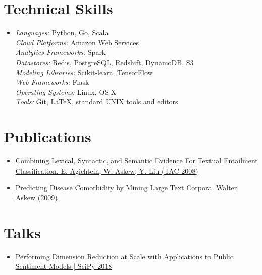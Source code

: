 \documentclass[letterpaper,10pt]{article}
\begin{document}
\section{Technical Skills}
  \begin{itemize}[leftmargin=*]
  \item[]
    \textit{Languages:} Python, Go, Scala \\
    \textit{Cloud Platforms:} Amazon Web Services\\
    \textit{Analytics Frameworks:} Spark \\
    \textit{Datastores:} Redis, PostgreSQL, Redshift, DynamoDB, S3 \\
    \textit{Modeling Libraries:} Scikit-learn, TensorFlow  \\
    \textit{Web Frameworks:} Flask \\
    \textit{Operating Systems:} Linux, OS X\\
    \textit{Tools:} Git, \LaTeX, standard UNIX tools and editors
  \end{itemize}

\section{Publications}
  \begin{itemize}[leftmargin=*]
    \item[]
      \href{http://www.nist.gov/tac/publications/2008/participant.papers/Emory.proceedings.pdf}
           {Combining Lexical, Syntactic, and Semantic Evidence For
             Textual Entailment Classification.  E. Agichtein,
             W. Askew, Y. Liu (TAC 2008)}
    \item[]
      \href{https://etd.library.emory.edu/concern/etds/736664895}
           {Predicting Disease Comorbidity by Mining Large Text
             Corpora. Walter Askew (2009)} 
  \end{itemize}

\section{Talks}
  \begin{itemize}[leftmargin=*]
    \item[]
      \href{https://www.youtube.com/watch?v=31YeSfDklfc}
           {Performing Dimension Reduction at Scale with Applications
             to Public Sentiment Models | SciPy 2018}
  \end{itemize}

%


\end{document}
